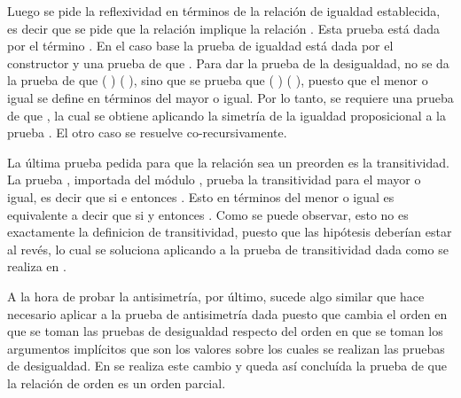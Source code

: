 \begin{AgdaAlign}
Luego se pide la reflexividad en términos de la relación de igualdad establecida, es decir que se pide que la relación \AgdaFunction{$\cong\bot$} implique la relación \AgdaFunction{$\lesssim\bot$}. Esta prueba está dada por el término \AgdaFunction{$\cong\bot\Rightarrow\lesssim\bot$}. En el caso base la prueba de igualdad está dada por el constructor  y una prueba  de que  \AgdaFunction{$\equiv$} . Para dar la prueba de la desigualdad, no se da la prueba de que ( ) \AgdaFunction{$\lesssim$} ( ), sino que se prueba que ( ) \AgdaFunction{$\gtrsim$} ( ), puesto que el menor o igual se define en términos del mayor o igual. Por lo tanto, se requiere una prueba de que  \AgdaFunction{$\equiv$} , la cual se obtiene aplicando la simetría de la igualdad proposicional a la prueba . El otro caso se resuelve co-recursivamente. 

La última prueba pedida para que la relación sea un preorden es la transitividad. La prueba , importada del módulo , prueba la transitividad para el mayor o igual, es decir que si  \AgdaFunction{$\gtrsim$}  e  \AgdaFunction{$\gtrsim$}  entonces  \AgdaFunction{$\gtrsim$} . Esto en términos del menor o igual es equivalente a decir que si  \AgdaFunction{$\lesssim$}  y  \AgdaFunction{$\lesssim$}  entonces  \AgdaFunction{$\lesssim$} . Como se puede observar, esto no es exactamente la definicion de transitividad, puesto que las hipótesis deberían estar al revés, lo cual se soluciona aplicando  a la prueba de transitividad dada como se realiza en .

A la hora de probar la antisimetría, por último, sucede algo similar que hace necesario aplicar  a la prueba de antisimetría dada puesto que cambia el orden en que se toman las pruebas de desigualdad respecto del orden en que se toman los argumentos implícitos que son los valores sobre los cuales se realizan las pruebas de desigualdad. En  se realiza este cambio y queda así concluída la prueba de que la relación de orden es un orden parcial. 


\end{AgdaAlign}
